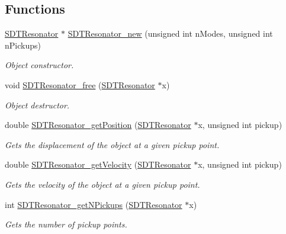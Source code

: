 \subsection*{Functions}
\begin{DoxyCompactItemize}
\item 
\hyperlink{group__resonators_ga07d183de45e9713277c8f62d93d9be9c}{S\+D\+T\+Resonator} $\ast$ \hyperlink{group__resonators_gafc2bc415946d68612d636498bb44b1fd}{S\+D\+T\+Resonator\+\_\+new} (unsigned int n\+Modes, unsigned int n\+Pickups)
\begin{DoxyCompactList}\small\item\em Object constructor. \end{DoxyCompactList}\item 
void \hyperlink{group__resonators_ga0b7fd515fd2eb17e061cbfcada75d397}{S\+D\+T\+Resonator\+\_\+free} (\hyperlink{group__resonators_ga07d183de45e9713277c8f62d93d9be9c}{S\+D\+T\+Resonator} $\ast$x)
\begin{DoxyCompactList}\small\item\em Object destructor. \end{DoxyCompactList}\item 
double \hyperlink{group__resonators_ga0663f869ee1b568cc2fe036d9bb792b8}{S\+D\+T\+Resonator\+\_\+get\+Position} (\hyperlink{group__resonators_ga07d183de45e9713277c8f62d93d9be9c}{S\+D\+T\+Resonator} $\ast$x, unsigned int pickup)
\begin{DoxyCompactList}\small\item\em Gets the displacement of the object at a given pickup point. \end{DoxyCompactList}\item 
double \hyperlink{group__resonators_ga110d43ebf6d69058d2532b1afa5b28f3}{S\+D\+T\+Resonator\+\_\+get\+Velocity} (\hyperlink{group__resonators_ga07d183de45e9713277c8f62d93d9be9c}{S\+D\+T\+Resonator} $\ast$x, unsigned int pickup)
\begin{DoxyCompactList}\small\item\em Gets the velocity of the object at a given pickup point. \end{DoxyCompactList}\item 
int \hyperlink{group__resonators_gaa6a3da7504ec721dfa7063f8a4c87916}{S\+D\+T\+Resonator\+\_\+get\+N\+Pickups} (\hyperlink{group__resonators_ga07d183de45e9713277c8f62d93d9be9c}{S\+D\+T\+Resonator} $\ast$x)
\begin{DoxyCompactList}\small\item\em Gets the number of pickup points. \end{DoxyCompactList}\item 

\end{DoxyCompactItemize}
